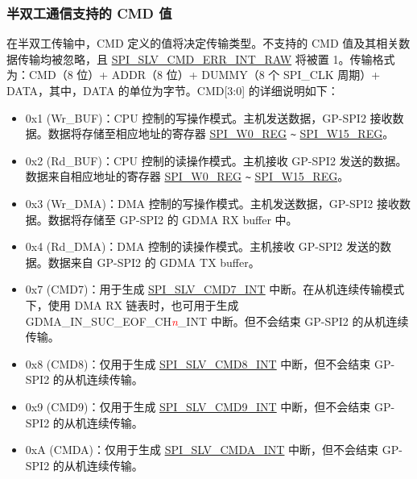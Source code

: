 \documentclass[main\_\_CN.tex]{subfiles}
\begin{document}
\subsubsection{半双工通信支持的 CMD 值} \label{GP-SPI2 HD salve format}

在半双工传输中，CMD 定义的值将决定传输类型。不支持的 CMD 值及其相关数据传输均被忽略，且 \hyperref[fielddesc:SPISLVCMDERRINTRAW]{SPI\_SLV\_CMD\_ERR\_INT\_RAW} 将被置 1。传输格式为：CMD（8 位）+ ADDR（8 位）+ DUMMY（8 个 SPI\_CLK 周期）+ DATA，其中，DATA 的单位为字节。CMD[3:0] 的详细说明如下：

\begin{itemize}
    \item \label{cmd:wrbuf} 0x1 (Wr\_BUF)：CPU 控制的写操作模式。主机发送数据，GP-SPI2 接收数据。数据将存储至相应地址的寄存器 \hyperref[regdesc:SPIW0REG]{SPI\_W0\_REG} \verb+~+ \hyperref[regdesc:SPIW15REG]{SPI\_W15\_REG}。

    \item \label{cmd:rdbuf} 0x2 (Rd\_BUF)：CPU 控制的读操作模式。主机接收 GP-SPI2 发送的数据。数据来自相应地址的寄存器 \hyperref[regdesc:SPIW0REG]{SPI\_W0\_REG} \verb+~+ \hyperref[regdesc:SPIW15REG]{SPI\_W15\_REG}。

    \item \label{cmd:wrdma} 0x3 (Wr\_DMA)：DMA 控制的写操作模式。主机发送数据，GP-SPI2 接收数据。数据将存储至 GP-SPI2 的 GDMA RX buffer 中。

    \item 0x4 (Rd\_DMA)：DMA 控制的读操作模式。主机接收 GP-SPI2 发送的数据。数据来自 GP-SPI2 的 GDMA TX buffer。

    \item \label{cmd:CMD7} 0x7 (CMD7)：用于生成 \hyperref[int:SPISLVCMD7INT]{SPI\_SLV\_CMD7\_INT} 中断。在从机连续传输模式下，使用 DMA RX 链表时，也可用于生成 GDMA\_IN\_SUC\_EOF\_CH\textcolor{red}{\it{n}}\_INT  中断。但不会结束 GP-SPI2 的从机连续传输。

    \item 0x8 (CMD8)：仅用于生成 \hyperref[int:SPISLVCMD8INT]{SPI\_SLV\_CMD8\_INT} 中断，但不会结束 GP-SPI2 的从机连续传输。

    \item 0x9 (CMD9)：仅用于生成 \hyperref[int:SPISLVCMD9INT]{SPI\_SLV\_CMD9\_INT} 中断，但不会结束 GP-SPI2 的从机连续传输。

    \item 0xA (CMDA)：仅用于生成 \hyperref[int:SPISLVCMDAINT]{SPI\_SLV\_CMDA\_INT} 中断，但不会结束 GP-SPI2 的从机连续传输。

\end{itemize}
\end{document}
